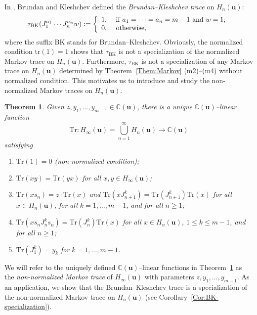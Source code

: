 \documentclass[a4paper, oneside]{amsart}
\numberwithin{equation}{section}
\newtheorem{theorem}[equation]{Theorem}
\theoremstyle{definition}
\theoremstyle{remark}
\begin{document}
In \cite[Appendix]{BK-Schur-Weyl}, Brundan and Kleshchev defined the \emph{Brundan--Kleshchev trace} on  $H_n(\boldsymbol{u})$:
\begin{equation*}
\tau_{\mathrm{BK}}(J_1^{a_1}\cdots J_n^{a_n} w)
        :=\left\{\vspace{1\jot}\begin{array}{ll} 1,&\text{ if }a_1=\cdots=a_n=m-1 \text{ and } w=1;\\
                0,&\text{ otherwise},
                \end{array}\right.
\end{equation*} where the suffix BK stands for Brundan--Kleshchev. Obviously, the normalized condition $\mathrm{tr}(1)=1$ shows that $\tau_{\mathrm{BK}}$ is not a specialization of the normalized Markov trace on $H_n(\boldsymbol{u})$. Furthermore, $\tau_{\mathrm{BK}}$ is not a specialization of any Markov trace  on $H_n(\boldsymbol{u})$ determined by Theorem~\ref{Them:Markov} (m2)--(m4) without normalized condition. This motivates us to introduce and study the non-normalized Markov traces on $H_n(\boldsymbol{u})$.


 \begin{theorem}\label{Them:Markov-BK}Given $z, y_1, \ldots, y_{m-1}\in \mathbb{C}(\boldsymbol{u})$, there is a unique $\mathbb{C}(\boldsymbol{u})$--linear function
   \begin{equation*}
     \mathrm{Tr}: H_{\infty}(\boldsymbol{u})=\bigcup_{n=1}^{\infty}H_n(\boldsymbol{u})\rightarrow \mathbb{C}(\boldsymbol{u})
\end{equation*}
satisfying
\begin{enumerate}
\item[(M1)] $ \mathrm{Tr}(1)=0$ (non-normalized condition);
\item[(M2)] $\mathrm{Tr}(xy)=\mathrm{Tr}(yx)$ for all $x,y\in H_{\infty}(\boldsymbol{u})$;
\item[(M3)] $\mathrm{Tr}(xs_n)=z\cdot\mathrm{Tr}(x)$ and $\mathrm{Tr}(xJ_{n+1}^k)=\mathrm{Tr}(J_{n+1}^k)\mathrm{Tr}(x)$  for all $x\in H_{n}(\boldsymbol{u})$, for all $k=1,\ldots,m-1$, and for all $n\geq 1$;
\item[(M4)] $\mathrm{Tr}(xs_nJ_{n}^ks_n)=\mathrm{Tr}(J_{n}^k)\mathrm{Tr}(x)$ for all $x\in H_n(\boldsymbol{u})$,  $1\leq k\leq m-1$, and for all $n\geq 1$;
  \item[(M5)] $\mathrm{Tr}(J_1^k)=y_k$ for $k=1, \ldots, m-1$.
\end{enumerate}
  \end{theorem}
We will refer to the uniquely defined $\mathbb{C}(\boldsymbol{u})$--linear functions in Theorem~\ref{Them:Markov-BK} as the \emph{non-normalized Markov trace} of $H_{\infty}(\boldsymbol{u})$ with parameters $z, y_1, \ldots, y_{m-1}$. As an application, we show  that the Brundan--Kleshchev trace is a specialization of the non-normalized Markov trace on $H_n(\boldsymbol{u})$ (see Corollary~\ref{Cor:BK-specialization}).
\end{document}
